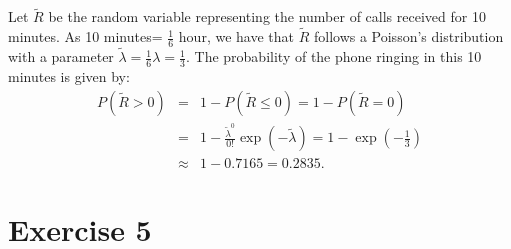 \documentclass[12pt,thmsa]{article}
\begin{document}
\begin{enumerate}
Let $ \tilde{R} $ be the random variable representing the number of calls received for 10 minutes.
As 10 minutes= $\frac{1}{6}$ hour, we have that $\tilde{R}$ follows a Poisson's distribution with a parameter $\tilde{\lambda}=\frac{1}{6}\lambda=\frac{1}{3}$.
The probability of the phone ringing in this 10 minutes is given by:
\begin{eqnarray*}
P(\tilde{R}>0) & = & \left. 1- P(\tilde{R}\leq 0) = 1- P(\tilde{R} = 0)  \right. \nonumber \\
& = & \left. 1- \frac{\tilde{\lambda}^{0}}{0!}\exp(-\tilde{\lambda}) = 1 -\exp\left(-\frac{1}{3}\right)\right. \nonumber \\
& \approx & \left. 1-0.7165 = 0.2835. \right. \nonumber
\end{eqnarray*}

\end{enumerate}





\section*{Exercise 5}
\end{document}
